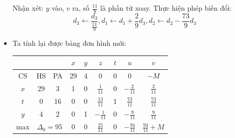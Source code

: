 \documentclass[12pt,a4paper]{article}
\begin{document}
\begin{itemize}
\begin{table}[H]
{\begin{tabular}{|ccc|c|c|c|c|c|c|}
						\end{tabular}}
					\end{table}
					Nhận xét: $y$ vào, $v$ ra, số $\frac{11}{9}$ là phần tử xoay.
					Thực hiện phép biến đổi:
					\[d_3 \leftarrow \frac{d_3}{\frac{11}{9}}, d_1 \leftarrow d_1 + \frac{2}{9}d_3, d_2 \leftarrow d_2 - \frac{73}{9}d_3\]
				\item Ta tính lại được bảng đơn hình mới:
					\begin{table}[H]
						\centering
						\setlength{\tabcolsep}{1.2em}
						{\renewcommand{\arraystretch}{1.5}\begin{tabular}{|ccc|c|c|c|c|c|c|}
						\hline
						\multicolumn{3}{|c|}{}                                                                                                          & \cellcolor[HTML]{B4C6E7}$x$ & \cellcolor[HTML]{B4C6E7}$y$ & \cellcolor[HTML]{B4C6E7}$z$ & \cellcolor[HTML]{B4C6E7}$t$ & \cellcolor[HTML]{B4C6E7}$u$              & \cellcolor[HTML]{B4C6E7}$v$ \\ \hline
						\multicolumn{1}{|c|}{\cellcolor[HTML]{B4C6E7}CS} & \multicolumn{1}{c|}{\cellcolor[HTML]{B4C6E7}HS} & \cellcolor[HTML]{B4C6E7}PA & 29                          & 4                           & 0                           & 0                           & 0                                        & $-M$                          \\ \hline
						\multicolumn{1}{|c|}{$x$}                        & \multicolumn{1}{c|}{29}                         & 3                          & 1                           & 0                           & $\frac{1}{11}$              & 0                           & $-\frac{2}{11}$                          & $\frac{2}{11}$              \\ \hline
						\multicolumn{1}{|c|}{$t$}                        & \multicolumn{1}{c|}{0}                          & 16                         & 0                           & 0                           & $\frac{13}{11}$             & 1                           & \cellcolor[HTML]{F4B084}$\frac{73}{11}$  & $\frac{73}{11}$             \\ \hline
						\multicolumn{1}{|c|}{$y$}                        & \multicolumn{1}{c|}{4}                          & 2                          & 0                           & 1                           & $-\frac{1}{11}$             & 0                           & $-\frac{9}{11}$                          & $\frac{9}{11}$              \\ \hline
						\multicolumn{1}{|c|}{max}                        & \multicolumn{2}{c|}{$\Delta_0 = 95$}                                         & 0                           & 0                           & $\frac{25}{11}$             & 0                           & \cellcolor[HTML]{F4B084}$-\frac{94}{11}$ & $\frac{94}{11} + M$         \\ \hline

\end{tabular}}
\end{table}
\end{itemize}
\end{document}
